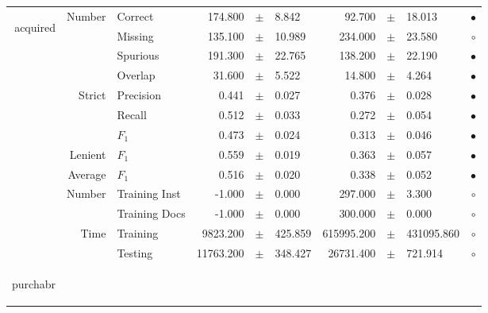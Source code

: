 \begin{longtable}{|r|r|l||rcl|rcl|c|}
\hline
\hline
\multirow{11}{*}{\begin{sideways}acquired\end{sideways} }
& \multirow{4}{*}{    Number} &         Correct &     174.800 &  $\pm$  &       8.842 &      92.700 &  $\pm$  &      18.013 & $\bullet$ \\
&                             &         Missing &     135.100 &  $\pm$  &      10.989 &     234.000 &  $\pm$  &      23.580 & $\circ$ \\
&                             &        Spurious &     191.300 &  $\pm$  &      22.765 &     138.200 &  $\pm$  &      22.190 & $\bullet$ \\
&                             &         Overlap &      31.600 &  $\pm$  &       5.522 &      14.800 &  $\pm$  &       4.264 & $\bullet$ \\
& \multirow{3}{*}{    Strict} &       Precision &       0.441 &  $\pm$  &       0.027 &       0.376 &  $\pm$  &       0.028 & $\bullet$ \\
&                             &          Recall &       0.512 &  $\pm$  &       0.033 &       0.272 &  $\pm$  &       0.054 & $\bullet$ \\
&                             &           $F_1$ &       0.473 &  $\pm$  &       0.024 &       0.313 &  $\pm$  &       0.046 & $\bullet$ \\
&                     Lenient &           $F_1$ &       0.559 &  $\pm$  &       0.019 &       0.363 &  $\pm$  &       0.057 & $\bullet$ \\
&                     Average &           $F_1$ &       0.516 &  $\pm$  &       0.020 &       0.338 &  $\pm$  &       0.052 & $\bullet$ \\
& \multirow{2}{*}{    Number} &   Training Inst &      -1.000 &  $\pm$  &       0.000 &     297.000 &  $\pm$  &       3.300 & $\circ$ \\
&                             &   Training Docs &      -1.000 &  $\pm$  &       0.000 &     300.000 &  $\pm$  &       0.000 & $\circ$ \\
& \multirow{2}{*}{      Time} &        Training &    9823.200 &  $\pm$  &     425.859 &  615995.200 &  $\pm$  &  431095.860 & $\circ$ \\
&                             &         Testing &   11763.200 &  $\pm$  &     348.427 &   26731.400 &  $\pm$  &     721.914 & $\circ$ \\
\hline
\hline
\multirow{11}{*}{\begin{sideways}purchabr\end{sideways} }

\end{longtable}
